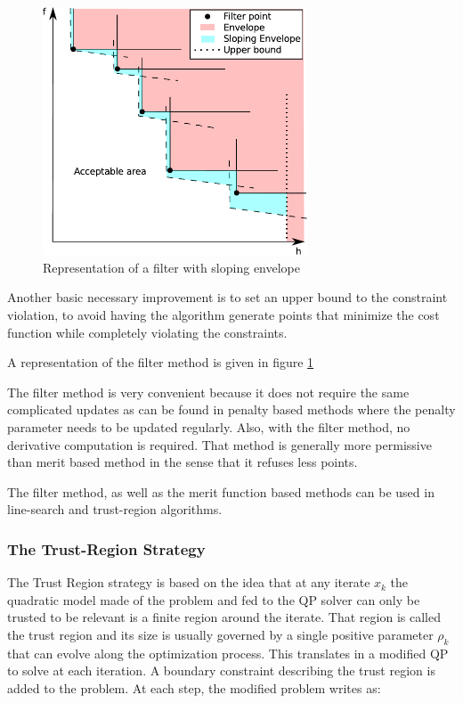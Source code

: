 \begin{figure}[ht]
  \centering
  \includegraphics[width=0.7\textwidth]{filter.pdf}
  \caption{Representation of a filter with sloping envelope}
  \label{fig:Filter}
\end{figure}

Another basic necessary improvement is to set an upper bound to the constraint violation, to avoid having the algorithm generate points that minimize the cost function while completely violating the constraints.

A representation of the filter method is given in figure \ref{fig:Filter}

The filter method is very convenient because it does not require the same complicated updates as can be found in penalty based methods where the penalty parameter needs to be updated regularly.
Also, with the filter method, no derivative computation is required.
That method is generally more permissive than merit based method in the sense that it refuses less points.

The filter method, as well as the merit function based methods can be used in line-search and trust-region algorithms.

\subsubsection{The Trust-Region Strategy}
The Trust Region strategy is based on the idea that at any iterate $x_k$ the quadratic model made of the problem and fed to the QP solver can only be trusted to be relevant is a finite region around the iterate.
That region is called the trust region and its size is usually governed by a single positive parameter $\rho_k$ that can evolve along the optimization process.
This translates in a modified QP to solve at each iteration.
A boundary constraint describing the trust region is added to the problem.
At each step, the modified problem writes as:

